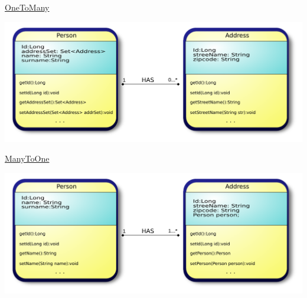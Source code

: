 \documentclass[xcolor=x11names,compress]{beamer}
\renewcommand{\(}{\begin{columns}}
\renewcommand{\)}{\end{columns}}
\newcommand{\<}[1]{\begin{column}{#1}}
\renewcommand{\>}{\end{column}}
\begin{document}
\begin{frame}{\underline{OneToMany}}
\justifying

\begin{center}

\includegraphics[keepaspectratio, width=\textwidth]{oneToMany}

\end{center}

\end{frame}

\begin{frame}{\underline{ManyToOne}}
\justifying

\begin{center}

\includegraphics[keepaspectratio, width=\textwidth]{manyToOne}

\end{center}

\end{frame}
\end{document}
